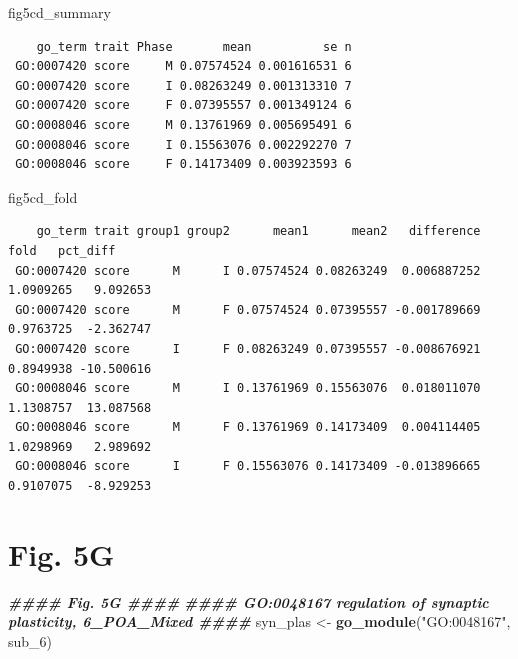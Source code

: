 \documentclass[
  landscape]{article}
\newenvironment{Shaded}{\begin{snugshade}}{\end{snugshade}}
\newcommand{\DocumentationTok}[1]{\textcolor[rgb]{0.56,0.35,0.01}{\textbf{\textit{#1}}}}
\newcommand{\FunctionTok}[1]{\textcolor[rgb]{0.13,0.29,0.53}{\textbf{#1}}}
\newcommand{\NormalTok}[1]{#1}
\newcommand{\OtherTok}[1]{\textcolor[rgb]{0.56,0.35,0.01}{#1}}
\newcommand{\StringTok}[1]{\textcolor[rgb]{0.31,0.60,0.02}{#1}}
\begin{document}
\begin{Shaded}
\begin{Highlighting}[]
\NormalTok{fig5cd\_summary}
\end{Highlighting}
\end{Shaded}

\begin{verbatim}
    go_term trait Phase       mean          se n
 GO:0007420 score     M 0.07574524 0.001616531 6
 GO:0007420 score     I 0.08263249 0.001313310 7
 GO:0007420 score     F 0.07395557 0.001349124 6
 GO:0008046 score     M 0.13761969 0.005695491 6
 GO:0008046 score     I 0.15563076 0.002292270 7
 GO:0008046 score     F 0.14173409 0.003923593 6
\end{verbatim}

\begin{Shaded}
\begin{Highlighting}[]
\NormalTok{fig5cd\_fold}
\end{Highlighting}
\end{Shaded}

\begin{verbatim}
    go_term trait group1 group2      mean1      mean2   difference      fold   pct_diff
 GO:0007420 score      M      I 0.07574524 0.08263249  0.006887252 1.0909265   9.092653
 GO:0007420 score      M      F 0.07574524 0.07395557 -0.001789669 0.9763725  -2.362747
 GO:0007420 score      I      F 0.08263249 0.07395557 -0.008676921 0.8949938 -10.500616
 GO:0008046 score      M      I 0.13761969 0.15563076  0.018011070 1.1308757  13.087568
 GO:0008046 score      M      F 0.13761969 0.14173409  0.004114405 1.0298969   2.989692
 GO:0008046 score      I      F 0.15563076 0.14173409 -0.013896665 0.9107075  -8.929253
\end{verbatim}

\section{Fig. 5G}\label{fig.-5g}

\begin{Shaded}
\begin{Highlighting}[]
\DocumentationTok{\#\#\#\# Fig. 5G \#\#\#\#}
\DocumentationTok{\#\#\#\# GO:0048167 regulation of synaptic plasticity, 6\_POA\_Mixed \#\#\#\#}
\NormalTok{syn\_plas }\OtherTok{\textless{}{-}} \FunctionTok{go\_module}\NormalTok{(}\StringTok{"GO:0048167"}\NormalTok{, sub\_6)}
\end{Highlighting}
\end{Shaded}
\end{document}

